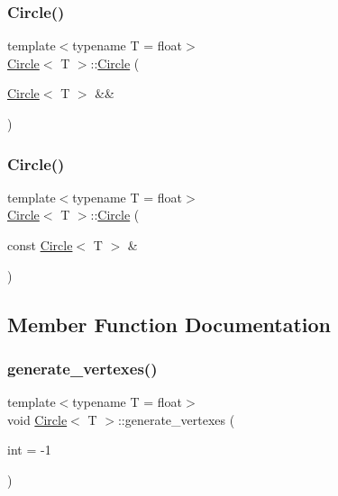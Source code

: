 \subsubsection{\texorpdfstring{Circle()}{Circle()}\hspace{0.1cm}{\footnotesize\ttfamily [2/3]}}
{\footnotesize\ttfamily template$<$typename T  = float$>$ \\
\mbox{\hyperlink{classCircle}{Circle}}$<$ T $>$\+::\mbox{\hyperlink{classCircle}{Circle}} (\begin{DoxyParamCaption}\item[{\mbox{\hyperlink{classCircle}{Circle}}$<$ T $>$ \&\&}]{ }\end{DoxyParamCaption})\hspace{0.3cm}{\ttfamily [default]}}

\mbox{\label{classCircle_a163162aa8beaceb25ebd9a17966f4bd5}} 
\subsubsection{\texorpdfstring{Circle()}{Circle()}\hspace{0.1cm}{\footnotesize\ttfamily [3/3]}}
{\footnotesize\ttfamily template$<$typename T  = float$>$ \\
\mbox{\hyperlink{classCircle}{Circle}}$<$ T $>$\+::\mbox{\hyperlink{classCircle}{Circle}} (\begin{DoxyParamCaption}\item[{const \mbox{\hyperlink{classCircle}{Circle}}$<$ T $>$ \&}]{ }\end{DoxyParamCaption})\hspace{0.3cm}{\ttfamily [default]}}



\subsection{Member Function Documentation}
\mbox{\label{classCircle_a07ce44d6b3a70ee7cbcf19e02e50c361}} 
\subsubsection{\texorpdfstring{generate\+\_\+vertexes()}{generate\_vertexes()}\hspace{0.1cm}{\footnotesize\ttfamily [1/2]}}
{\footnotesize\ttfamily template$<$typename T  = float$>$ \\
void \mbox{\hyperlink{classCircle}{Circle}}$<$ T $>$\+::generate\+\_\+vertexes (\begin{DoxyParamCaption}\item[{int}]{ = {\ttfamily -\/1} }\end{DoxyParamCaption})\hspace{0.3cm}{\ttfamily [private]}}

